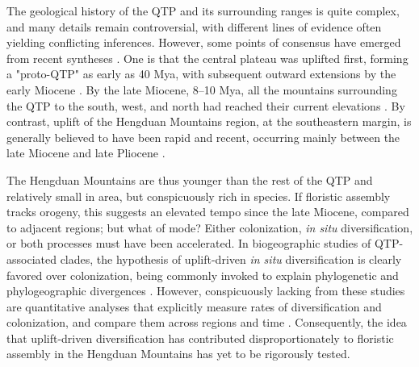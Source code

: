 The geological history of the QTP and its surrounding ranges is quite
complex, and many details remain controversial, with different lines
of evidence often yielding conflicting inferences. However, some
points of consensus have emerged from recent syntheses
\citep{WangC2014,Favre2015,Deng2015,Renner2016}. One is that the
central plateau was uplifted first, forming a "proto-QTP" as early as
40 Mya, with subsequent outward extensions by the early Miocene
\citep{Rowley2006,WangC2014}. By the late Miocene, 8--10 Mya, all the
mountains surrounding the QTP to the south, west, and north had
reached their current elevations
\citep{Spicer2003,Fang2005,WangY2012,Deng2015}. By contrast, uplift of
the Hengduan Mountains region, at the southeastern margin, is
generally believed to have been rapid and recent, occurring mainly
between the late Miocene and late Pliocene
\citep{kirby2002,clark2005,WangE2012,Wang2014,Meng2016,SunB2011}.%

The Hengduan Mountains are thus younger than the rest of the QTP and
relatively small in area, but conspicuously rich in species. If
floristic assembly tracks orogeny, this suggests an elevated tempo
since the late Miocene, compared to adjacent regions; but what of
mode? Either colonization, \textit{in situ} diversification, or both
processes must have been accelerated. In biogeographic studies of
QTP-associated clades, the hypothesis of uplift-driven \textit{in
  situ} diversification is clearly favored over colonization, being
commonly invoked to explain phylogenetic and phylogeographic
divergences
\citep[e.g.,][]{LiuJ2006,WangY2009,ZhangJ2014,GaoY2013}. However,
conspicuously lacking from these studies are quantitative analyses
that explicitly measure rates of diversification and colonization, and
compare them across regions and time
\citep{Wen2014,Favre2015}. Consequently, the idea that uplift-driven
diversification has contributed disproportionately to floristic
assembly in the Hengduan Mountains has yet to be rigorously tested.


